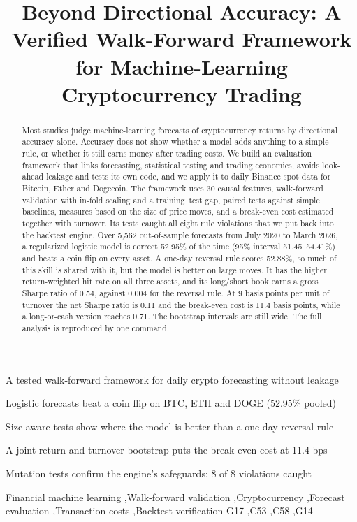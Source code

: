 \documentclass[preprint,12pt,authoryear,a4paper]{elsarticle}
\begin{document}
\begin{frontmatter}

\title{Beyond Directional Accuracy: A Verified Walk-Forward Framework for
Machine-Learning Cryptocurrency Trading}

\begin{abstract}
Most studies judge machine-learning forecasts of cryptocurrency returns by
directional accuracy alone. Accuracy does not show whether a model adds anything to
a simple rule, or whether it still earns money after trading costs. We build an
evaluation framework that links forecasting, statistical testing and trading
economics, avoids look-ahead leakage and tests its own code, and we apply it to
daily Binance spot data for Bitcoin, Ether and Dogecoin. The framework uses 30
causal features, walk-forward validation with in-fold scaling and a training--test
gap, paired tests against simple baselines, measures based on the size of price
moves, and a break-even cost estimated together with turnover. Its tests caught all
eight rule violations that we put back into the backtest engine. Over 5,562
out-of-sample forecasts from July 2020 to March 2026, a regularized logistic model
is correct 52.95\% of the time (95\% interval 51.45--54.41\%) and beats a coin flip
on every asset. A one-day reversal rule scores 52.88\%, so much of this skill is
shared with it, but the model is better on large moves. It has the higher
return-weighted hit rate on all three assets, and its long/short book earns a gross
Sharpe ratio of 0.54, against 0.004 for the reversal rule. At 9 basis points per
unit of turnover the net Sharpe ratio is 0.11 and the break-even cost is 11.4 basis
points, while a long-or-cash version reaches 0.71. The bootstrap intervals are
still wide. The full analysis is reproduced by one command.
\end{abstract}

\begin{highlights}
\item A tested walk-forward framework for daily crypto forecasting without leakage
\item Logistic forecasts beat a coin flip on BTC, ETH and DOGE (52.95\% pooled)
\item Size-aware tests show where the model is better than a one-day reversal rule
\item A joint return and turnover bootstrap puts the break-even cost at 11.4 bps
\item Mutation tests confirm the engine's safeguards: 8 of 8 violations caught
\end{highlights}

\begin{keyword}
Financial machine learning \sep Walk-forward validation \sep Cryptocurrency
\sep Forecast evaluation \sep Transaction costs \sep Backtest verification
\JEL G17 \sep C53 \sep C58 \sep G14
\end{keyword}

\end{frontmatter}
\end{document}
